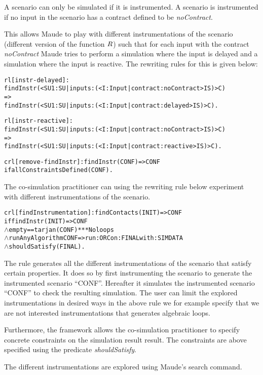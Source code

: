 A scenario can only be simulated if it is instrumented.
A scenario is instrumented if no input in the scenario has a contract defined to be \textit{noContract}.


This allows Maude to play with different instrumentations of the scenario (different version of the function $R$) such that for each input with the contract \textit{noContract} Maude tries to perform a simulation where the input is delayed and a simulation where the input is reactive.
The rewriting rules for this is given below:
\begin{alltt}
rl [instr-delayed]: 
findInstr(< SU1 : SU | inputs : (< I : Input | contract : noContract > IS) > C)
=>
findInstr(< SU1 : SU | inputs : (< I : Input | contract : delayed > IS) > C) .

rl [instr-reactive]: 
findInstr(< SU1 : SU | inputs : (< I : Input | contract : noContract > IS) > C)
=>
findInstr(< SU1 : SU | inputs : (< I : Input | contract : reactive > IS) > C) .

crl [remove-findInstr]: findInstr(CONF) => CONF 
  if allConstraintsDefined(CONF) .
\end{alltt}

The co-simulation practitioner can using the rewriting rule below experiment with different instrumentations of the scenario.

\begin{alltt}
  crl [findInstrumentation]: findContacts(INIT) => CONF
      if findInstr(INIT) => CONF
      \(\land\) empty == tarjan(CONF) *** No loops
      \(\land\) runAnyAlgorithm CONF => run: ORC on: FINAL with: SIMDATA
      \(\land\) shouldSatisfy(FINAL) .
  \end{alltt}

The rule generates all the different instrumentations of the scenario that satisfy certain properties.
It does so by first instrumenting the scenario to generate the instrumented scenario ``CONF''.
Hereafter it simulates the instrumented scenario ``CONF'' to check the resulting simulation.
The user can limit the explored instrumentations in desired ways in the above rule we for example specify that we are not interested instrumentations that generates algebraic loops.

Furthermore, the framework allows the co-simulation practitioner to specify concrete constraints on the simulation result result.
The constraints are above specified using the predicate \emph{shouldSatisfy}.

The different instrumentations are explored using Maude's search command.

